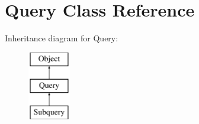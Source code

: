 \hypertarget{classQuery}{\section{Query Class Reference}
\label{classQuery}
}
Inheritance diagram for Query\-:\begin{figure}[H]
\begin{center}
\leavevmode
\includegraphics[height=3.000000cm]{classQuery}
\end{center}
\end{figure}

